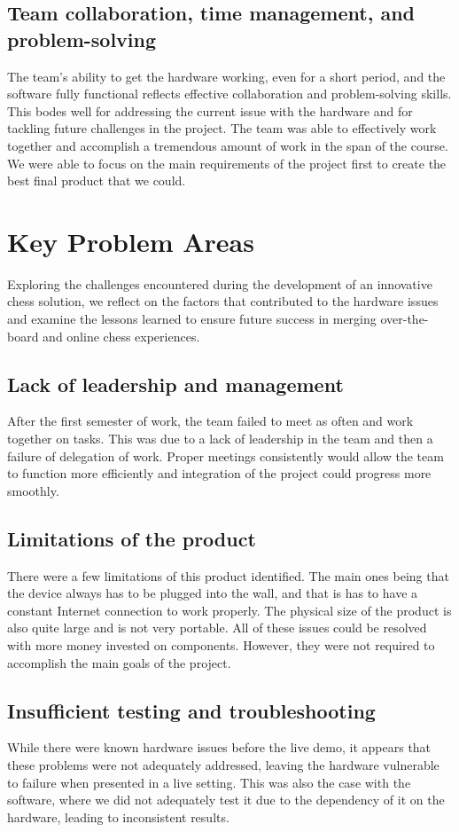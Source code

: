 \documentclass{article}
\begin{document}
\subsection{Team collaboration, time management, and problem-solving}
The team's ability to get the hardware working, even for a short period, and the software fully functional reflects effective collaboration and problem-solving skills. This bodes well for addressing the current issue with the hardware and for tackling future challenges in the project.
The team was able to effectively work together and accomplish a tremendous amount of work in the span of the course. We were able to focus on the main requirements of the project first to create the best final product that we could.

\section{Key Problem Areas}
 
Exploring the challenges encountered during the development of an innovative chess solution, we reflect on the factors that contributed to the hardware issues and examine the lessons learned to ensure future success in merging over-the-board and online chess experiences.

\subsection{Lack of leadership and management} 
After the first semester of work, the team failed to meet as often and work together on tasks. 
This was due to a lack of leadership in the team and then a failure of delegation of work. 
Proper meetings consistently would allow the team to function more efficiently and integration
of the project could progress more smoothly. 

\subsection{Limitations of the product}
There were a few limitations of this product identified. The main ones being that the device always has to be plugged into the wall, and that is has to have a constant Internet connection to work properly. The physical size of the product is also 
quite large and is not very portable. All of these issues could be resolved with more money invested on components. However, they were not required to accomplish the main goals of the project.

\subsection{Insufficient testing and troubleshooting}
While there were known hardware issues before the live demo, it appears that these problems were not adequately addressed, leaving the hardware vulnerable to failure when presented in a live setting.
This was also the case with the software, where we did not adequately test it due to the dependency of it on the hardware, leading to inconsistent results.
\end{document}
